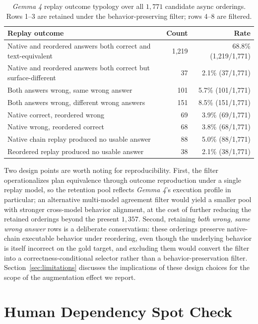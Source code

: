 \documentclass{article}
\providecommand{\model}[1]{\emph{#1}}
\begin{document}
\begin{table}[H]
\centering
\scriptsize
\begin{tabular}{lrr}
\toprule
Replay outcome & Count & Rate \\
\midrule
Native and reordered answers both correct and text-equivalent & 1{,}219 & 68.8\% (1{,}219/1{,}771) \\
Native and reordered answers both correct but surface-different & 37 & 2.1\% (37/1{,}771) \\
Both answers wrong, same wrong answer & 101 & 5.7\% (101/1{,}771) \\
Both answers wrong, different wrong answers & 151 & 8.5\% (151/1{,}771) \\
Native correct, reordered wrong & 69 & 3.9\% (69/1{,}771) \\
Native wrong, reordered correct & 68 & 3.8\% (68/1{,}771) \\
Native chain replay produced no usable answer & 88 & 5.0\% (88/1{,}771) \\
Reordered replay produced no usable answer & 38 & 2.1\% (38/1{,}771) \\
\bottomrule
\end{tabular}
\vspace{0.05cm}
\caption{\model{Gemma 4} replay outcome typology over all $1{,}771$ candidate async orderings. Rows 1--3 are retained under the behavior-preserving filter; rows 4--8 are filtered.}
\label{tab:appendix-current-replay-outcomes}
\end{table}

Two design points are worth noting for reproducibility. First, the filter operationalizes plan equivalence through outcome reproduction under a single replay model, so the retention pool reflects \model{Gemma 4}'s execution profile in particular; an alternative multi-model agreement filter would yield a smaller pool with stronger cross-model behavior alignment, at the cost of further reducing the retained orderings beyond the present $1{,}357$. Second, retaining \emph{both wrong, same wrong answer} rows is a deliberate conservatism: these orderings preserve native-chain executable behavior under reordering, even though the underlying behavior is itself incorrect on the gold target, and excluding them would convert the filter into a correctness-conditional selector rather than a behavior-preservation filter. Section~\ref{sec:limitations} discusses the implications of these design choices for the scope of the augmentation effect we report.


\section{Human Dependency Spot Check}
\label{sec:appendix-spot-check-current}
\end{document}
